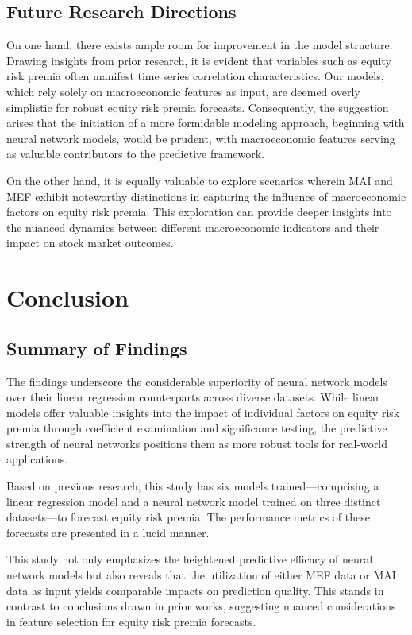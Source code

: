 \documentclass{article}
\begin{document}
\subsection{Future Research Directions}

On one hand, there exists ample room for improvement in the model structure. Drawing insights from prior research, it is evident that variables such as equity risk premia often manifest time series correlation characteristics. Our models, which rely solely on macroeconomic features as input, are deemed overly simplistic for robust equity risk premia forecasts. Consequently, the suggestion arises that the initiation of a more formidable modeling approach, beginning with neural network models, would be prudent, with macroeconomic features serving as valuable contributors to the predictive framework.

\noindent On the other hand, it is equally valuable to explore scenarios wherein MAI and MEF exhibit noteworthy distinctions in capturing the influence of macroeconomic factors on equity risk premia. This exploration can provide deeper insights into the nuanced dynamics between different macroeconomic indicators and their impact on stock market outcomes.

\newpage

\section{Conclusion}

\subsection{Summary of Findings}

The findings underscore the considerable superiority of neural network models over their linear regression counterparts across diverse datasets. While linear models offer valuable insights into the impact of individual factors on equity risk premia through coefficient examination and significance testing, the predictive strength of neural networks positions them as more robust tools for real-world applications.

\noindent Based on previous research,  this study has six models trained—comprising a linear regression model and a neural network model trained on three distinct datasets—to forecast equity risk premia. The performance metrics of these forecasts are presented in a lucid manner.

\noindent This study not only emphasizes the heightened predictive efficacy of neural network models but also reveals that the utilization of either MEF data or MAI data as input yields comparable impacts on prediction quality. This stands in contrast to conclusions drawn in prior works, suggesting nuanced considerations in feature selection for equity risk premia forecasts.
\end{document}
